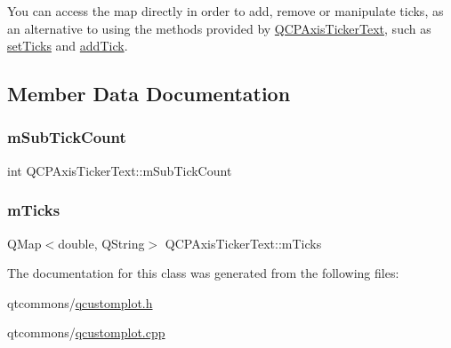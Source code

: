 You can access the map directly in order to add, remove or manipulate ticks, as an alternative to using the methods provided by \mbox{\hyperlink{class_q_c_p_axis_ticker_text}{Q\+C\+P\+Axis\+Ticker\+Text}}, such as \mbox{\hyperlink{class_q_c_p_axis_ticker_text_a8cdf1f21940f1f53f5e3d30b2c74f5cf}{set\+Ticks}} and \mbox{\hyperlink{class_q_c_p_axis_ticker_text_aada3db69e5fc6585aaa4ea5d89552eb0}{add\+Tick}}. 

\subsection{Member Data Documentation}
\mbox{\label{class_q_c_p_axis_ticker_text_a206d092b1598eecb981bba7fb16ff44e}} 
\subsubsection{\texorpdfstring{mSubTickCount}{mSubTickCount}}
{\footnotesize\ttfamily int Q\+C\+P\+Axis\+Ticker\+Text\+::m\+Sub\+Tick\+Count\hspace{0.3cm}{\ttfamily [protected]}}

\mbox{\label{class_q_c_p_axis_ticker_text_a27c48539feb6c293979cd8059ba220c3}} 
\subsubsection{\texorpdfstring{mTicks}{mTicks}}
{\footnotesize\ttfamily Q\+Map$<$double, Q\+String$>$ Q\+C\+P\+Axis\+Ticker\+Text\+::m\+Ticks\hspace{0.3cm}{\ttfamily [protected]}}



The documentation for this class was generated from the following files\+:\begin{DoxyCompactItemize}
\item 
qtcommons/\mbox{\hyperlink{qcustomplot_8h}{qcustomplot.\+h}}\item 
qtcommons/\mbox{\hyperlink{qcustomplot_8cpp}{qcustomplot.\+cpp}}\end{DoxyCompactItemize}
